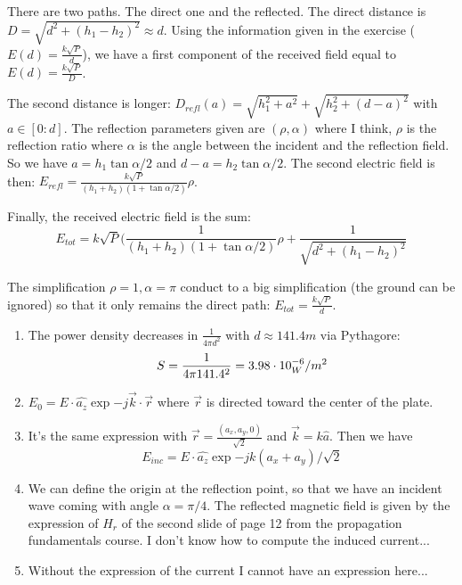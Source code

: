 
\begin{solution}
	There are two paths. The direct one and the reflected. The direct distance is $D = \sqrt{d^2 + (h_1 - h_2)^2} \approx d$. Using the information given in the exercise ($E(d) = \frac{k\sqrt{P}}{d}$), we have a first component of the received field equal to $E(d) = \frac{k\sqrt{P}}{D}$.

	
	The second distance is longer: $D_{refl}(a) = \sqrt{h_1^2 + a^2} + \sqrt{h_2^2 + (d - a)^2}$ with $a \in [0:d]$. 	
	The reflection parameters given are $(\rho, \alpha)$ where I think, $\rho$ is the reflection ratio where $\alpha$ is the angle between the incident and the reflection field. So we have $a = h_1 \tan{\alpha/2}$ and $d - a = h_2 \tan{\alpha/2}$. 
	The second electric field is then: $E_{refl} = \frac{k\sqrt{P}}{(h_1 + h_2)(1 + \tan{\alpha/2})}\rho$.
	
	
	Finally, the received electric field is the sum:
	$$E_{tot} = k\sqrt{P} (\frac{1}{(h_1 + h_2)(1 + \tan{\alpha/2})}\rho + \frac{1}{\sqrt{d^2 + (h_1 - h_2)^2}}$$

	
	The simplification $\rho = 1, \alpha = \pi$ conduct to a big simplification (the ground can be ignored) so that it only remains the direct path: $E_{tot} = \frac{k\sqrt{P}}{d}$.
\end{solution}

\begin{solution}
	\begin{enumerate}
		\item The power density decreases in $\frac{1}{4\pi d^2}$ with $d \approx 141.4m$ via Pythagore:
			  $$ S = \frac{1}{4\pi 141.4^2} = 3.98\cdot 10^{-6}_W/m^2 $$
		\item $E_0 = E \cdot \hat{a_z} \exp{-j\vec{k} \cdot \vec{r}}$ where $\vec{r}$ is directed toward the center of the plate.
		\item It's the same expression with $\vec{r} = \frac{(a_x, a_y, 0)}{\sqrt{2}}$ and $\vec{k} = k \hat{a}$. Then we have 
			  $$E_{inc} = E \cdot \hat{a_z} \exp{-j k (a_x + a_y)/\sqrt{2}}$$ 

			  \notsure
			  
		\item We can define the origin at the reflection point, so that we have an incident wave coming with angle $\alpha = \pi/4$. The reflected magnetic field is given by the expression of $H_r$ of the second slide of page 12 from the propagation fundamentals course.
			  \notsure I don't know how to compute the induced current...
		\item Without the expression of the current I cannot have an expression here... \notsure
	\end{enumerate}
\end{solution}

